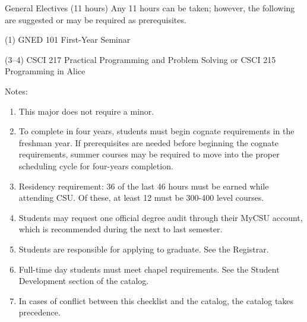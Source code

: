 \begin{reqgroup}{General Electives (11 hours)}
Any 11 hours can be taken; however, the following are suggested or may be required as prerequisites.
\begin{checklist}
\begin{minipage}[t]{\linewidth}
	\item (1)	GNED 101	First-Year Seminar
	\item (3--4)	CSCI 217	Practical Programming and Problem Solving or CSCI 215	Programming in Alice\\
	\begin{minipage}[t]{0.5\linewidth}
		\blankReq
	\end{minipage}
	\begin{minipage}[t]{0.5\linewidth}
		\blankReq
	\end{minipage}
\end{minipage}
\end{checklist}
\end{reqgroup}

Notes:%
\begin{enumerate}\footnotesize
	\item This major does not require a minor.
	\item To complete in four years, students must begin cognate requirements in the freshman year. If prerequisites are needed before beginning the cognate requirements, summer courses may be required to move into the proper scheduling cycle for four-years completion.
	\item Residency requirement: 36 of the last 46 hours must be earned while attending CSU. Of these, at least 12 must be 300-400 level courses.
	\item Students may request one official degree audit through their MyCSU account, which is recommended during the next to last semester.
	\item Students are responsible for applying to graduate. See the Registrar.
	\item Full-time day students must meet chapel requirements. See the Student Development section of the catalog.
	\item In cases of conflict between this checklist and the catalog, the catalog takes precedence.
\end{enumerate}
